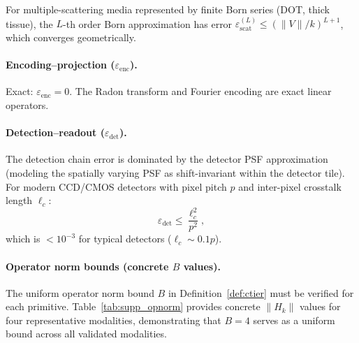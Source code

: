 For multiple-scattering media represented by finite Born series (DOT, thick tissue), the $L$-th order Born approximation has error $\varepsilon_{\mathrm{scat}}^{(L)} \leq (\|V\|/k)^{L+1}$, which converges geometrically.

\paragraph{Encoding--projection ($\varepsilon_{\mathrm{enc}}$).}
Exact: $\varepsilon_{\mathrm{enc}} = 0$. The Radon transform and Fourier encoding are exact linear operators.

\paragraph{Detection--readout ($\varepsilon_{\mathrm{det}}$).}
The detection chain error is dominated by the detector PSF approximation (modeling the spatially varying PSF as shift-invariant within the detector tile). For modern CCD/CMOS detectors with pixel pitch $p$ and inter-pixel crosstalk length $\ell_c$:
\begin{equation}
  \varepsilon_{\mathrm{det}} \leq \frac{\ell_c^2}{p^2},
\end{equation}
which is $< 10^{-3}$ for typical detectors ($\ell_c \sim 0.1 p$).

\paragraph{Operator norm bounds (concrete $B$ values).}
The uniform operator norm bound $B$ in Definition~\ref{def:ctier} must be verified for each primitive. Table~\ref{tab:supp_opnorm} provides concrete $\|H_k\|$ values for four representative modalities, demonstrating that $B = 4$ serves as a uniform bound across all validated modalities.

